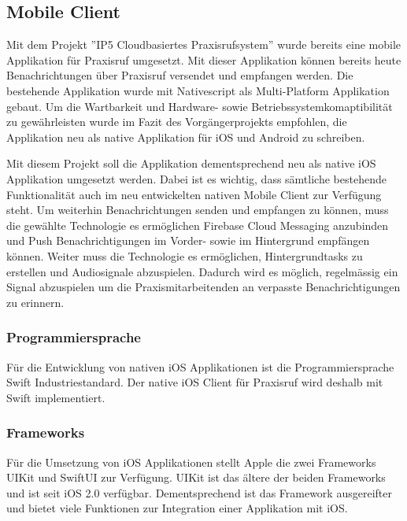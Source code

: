 
\subsection{Mobile Client}

Mit dem Projekt ''IP5 Cloudbasiertes Praxisrufsystem'' wurde bereits eine mobile Applikation für Praxisruf umgesetzt.
Mit dieser Applikation können bereits heute Benachrichtungen über Praxisruf versendet und empfangen werden.\cite{ip5}
Die bestehende Applikation wurde mit Nativescript\cite{nativescript} als Multi-Platform Applikation gebaut.
Um die Wartbarkeit und Hardware- sowie Betriebssystemkomaptibilität zu gewährleisten wurde im Fazit des Vorgängerprojekts empfohlen,
die Applikation neu als native Applikation für iOS und Android zu schreiben.\cite{ip5}

Mit diesem Projekt soll die Applikation dementsprechend neu als native iOS Applikation umgesetzt werden.
Dabei ist es wichtig, dass sämtliche bestehende Funktionalität auch im neu entwickelten nativen Mobile Client zur Verfügung steht.
Um weiterhin Benachrichtungen senden und empfangen zu können, muss die gewählte Technologie es ermöglichen Firebase Cloud Messaging anzubinden
und Push Benachrichtigungen im Vorder- sowie im Hintergrund empfängen können.
Weiter muss die Technologie es ermöglichen, Hintergrundtasks zu erstellen und Audiosignale abzuspielen.
Dadurch wird es möglich, regelmässig ein Signal abzuspielen um die Praxismitarbeitenden an verpasste Benachrichtigungen zu erinnern.

\subsubsection*{Programmiersprache}

Für die Entwicklung von nativen iOS Applikationen ist die Programmiersprache Swift Industriestandard.\cite{ios_swift}
Der native iOS Client für Praxisruf wird deshalb mit Swift implementiert.

\subsubsection*{Frameworks}

Für die Umsetzung von iOS Applikationen stellt Apple die zwei Frameworks UIKit\cite{ios_uikit} und SwiftUI\cite{ios_swift_ui} zur Verfügung.
UIKit ist das ältere der beiden Frameworks und ist seit iOS 2.0 verfügbar.
Dementsprechend ist das Framework ausgereifter und bietet viele Funktionen zur Integration einer Applikation mit iOS.\cite{ios_uikit}

